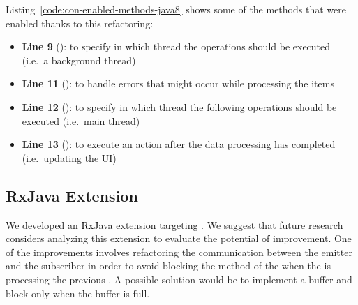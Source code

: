 \documentclass[type=bsc,accentcolor=tud9c]{tudthesis}
\newcommand{\framework}[1]{\textcolor{black}{#1}}
\begin{document}


Listing~\ref{code:con-enabled-methods-java8} shows some of the methods that were enabled thanks to this refactoring:
\begin{itemize}
	\item {\bfseries Line 9} (): to specify in which thread the operations should be executed (i.e.~a background thread)
	\item {\bfseries Line 11} (): to handle errors that might occur while processing the items
	\item {\bfseries Line 12} (): to specify in which thread the following operations should be executed (i.e.~main thread)
	\item {\bfseries Line 13} (): to execute an action after the data processing has completed (i.e.~updating the UI)
\end{itemize}



\subsection{RxJava Extension}
We developed an \framework{RxJava} extension targeting . We suggest that future research considers analyzing this extension to evaluate the potential of improvement. One of the improvements involves refactoring the communication between the emitter  and the subscriber  in order to avoid blocking the  method of the  when the  is processing the previous . A possible solution would be to implement a buffer and block only when the buffer is full.


\nocite{*}



\def\appendixstart{\chapter{Appendix} \section{SwingWorker API}\label{swingworkerapi}}


\end{document}

